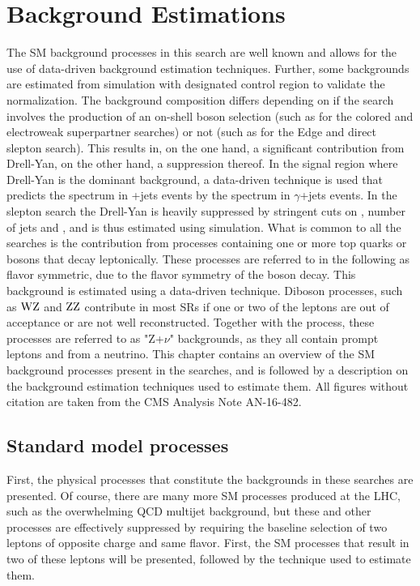 \chapter{Background Estimations}\label{sec:backgrounds}
\noindent\justify
The SM background processes in this search are well known and allows for the use of data-driven background estimation techniques. 
Further, some backgrounds are estimated from simulation with designated control region to validate the normalization. 
\newpara
\noindent\justify
The background composition differs depending on if the search involves the production of an on-shell \PZ boson selection (such as for the colored and electroweak superpartner searches) or not (such as for the Edge and direct slepton search). 
This results in, on the one hand, a significant contribution from Drell-Yan, on the other hand, a suppression thereof. 
In the signal region where Drell-Yan is the dominant background, a data-driven technique is used that predicts the \ptmiss spectrum in \PZ+jets events by the \ptmiss spectrum in $\gamma$+jets events.
In the slepton search the Drell-Yan is heavily suppressed by stringent cuts on \ptmiss, number of jets and \mttwo, and is thus estimated using simulation.  
What is common to all the searches is the contribution from processes containing one or more top quarks or \PW bosons that decay leptonically. 
These processes are referred to in the following as flavor symmetric, due to the flavor symmetry of the \PW boson decay. 
This background is estimated using a data-driven technique. 
Diboson processes, such as $\mathrm{WZ}$ and $\mathrm{ZZ}$ contribute in most SRs if one or two of the leptons are out of acceptance or are not well reconstructed. 
Together with the \ttZ process, these processes are referred to as "Z+$\nu$" backgrounds, as they all contain prompt leptons and \ptmiss from a neutrino.   
\newpara
\noindent\justify
This chapter contains an overview of the SM background processes present in the searches, and is followed by a description on the background estimation techniques used to estimate them. 
All figures without citation are taken from the CMS Analysis Note AN-16-482. 
\newpage
\section{Standard model processes}
\noindent\justify
First, the physical processes that constitute the backgrounds in these searches are presented. 
Of course, there are many more SM processes produced at the LHC, such as the overwhelming QCD multijet background, but these and other processes are effectively suppressed by requiring the baseline selection of two leptons of opposite charge and same flavor. 
First, the SM processes that result in two of these leptons will be presented, followed by the technique used to estimate them. 
